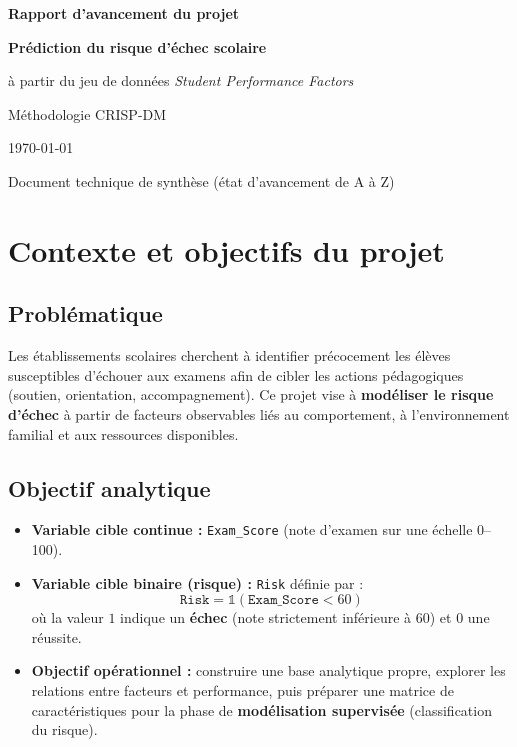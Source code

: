 \documentclass[a4paper,11pt]{article}
\begin{document}
\begin{titlepage}
  \centering
  \vspace*{1.5cm}
  {\LARGE\bfseries Rapport d'avancement du projet\par}
  \vspace{0.8cm}
  {\Huge\bfseries Prédiction du risque d'échec scolaire\par}
  \vspace{0.5cm}
  {\large à partir du jeu de données \textit{Student Performance Factors}\par}
  \vfill
  {\large Méthodologie CRISP-DM\par}
  \vspace{1cm}
  {\large \today\par}
  \vspace{1.5cm}
  {\normalsize Document technique de synthèse (état d'avancement de A à Z)\par}
\end{titlepage}

\tableofcontents
\newpage

\section{Contexte et objectifs du projet}

\subsection{Problématique}
Les établissements scolaires cherchent à identifier précocement les élèves susceptibles d'échouer aux examens afin de cibler les actions pédagogiques (soutien, orientation, accompagnement). Ce projet vise à \textbf{modéliser le risque d'échec} à partir de facteurs observables liés au comportement, à l'environnement familial et aux ressources disponibles.

\subsection{Objectif analytique}
\begin{itemize}[leftmargin=*]
  \item \textbf{Variable cible continue :} \texttt{Exam\_Score} (note d'examen sur une échelle 0--100).
  \item \textbf{Variable cible binaire (risque) :} \texttt{Risk} définie par :
  \[
    \texttt{Risk} = \mathbb{1}(\texttt{Exam\_Score} < 60)
  \]
  où la valeur $1$ indique un \textbf{échec} (note strictement inférieure à 60) et $0$ une réussite.
  \item \textbf{Objectif opérationnel :} construire une base analytique propre, explorer les relations entre facteurs et performance, puis préparer une matrice de caractéristiques pour la phase de \textbf{modélisation supervisée} (classification du risque).
\end{itemize}
\end{document}
